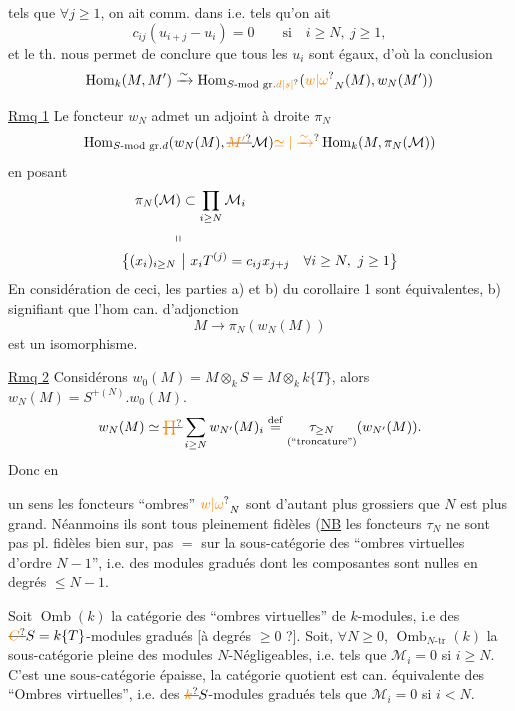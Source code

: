 tels que $\forall j\geq1$, on ait comm. dans
i.e. tels qu'on ait
\[
c_{ij}(u_{i+j}-u_i)=0\qquad\text{si}\quad i\geq N,\ j\geq1,
\]
et le th. nous permet de conclure que tous les $u_i$ sont égaux, d'où la conclusion
\[
\operatorname{Hom}_k(M,M')\xrightarrow{\sim}\operatorname{Hom}_{S\text{-mod gr.}\unsure{d|s|{}}}(\unsure{w|\omega}_N(M),w_N(M'))
\]

\uline{Rmq 1} Le foncteur $w_N$ admet un adjoint à droite $\pi_N$
\[
\operatorname{Hom}_{S\text{-mod gr.}d}(w_N(M),\deleted{\unsure{M'}}\mathcal M)\unsure{\simeq|\xrightarrow{\sim}}\operatorname{Hom}_k(M,\pi_N(\mathcal M))
\]
en posant
\[
\begin{aligned}
\pi_N(\mathcal M)&\subset\prod_{i\geq N}\mathcal M_i\\
\shortparallel&\\
\bigl\{(x_i)_{i\geq N}\ &\big|\ x_iT^{(j)}=c_{ij}x_{j+j}\quad\forall i\geq N,\ j\geq1\bigr\}
\end{aligned}
\]
En considération de ceci,  les parties a) et b) du corollaire 1 sont équivalentes, b) signifiant que l'hom can. d'adjonction
\[
M\longrightarrow\pi_N(w_N(M))
\]
est  un isomorphisme.

\uline{Rmq 2} Considérons $w_0(M)=M\otimes_k S=M\otimes_k k\{T\}$, alors $w_N(M)=S^{+(N)}.w_0(M)$.  
\[
w_N(M)\simeq\deleted{\unsure{\prod}}\sum_{i\geq N}w_{N'}(M)_i\overset{\mathrm{def}}{=}\underset{\text{(``troncature'')}}{\tau_{\geq N}}(w_{N'}(M)).
\]
Donc en

un sens les foncteurs ``ombres'' $\unsure{w|\omega}_N$ sont d'autant plus grossiers que $N$ est plus grand. Néanmoins ils sont tous pleinement fidèles (\uline{NB} les foncteurs $\tau_N$ ne sont pas pl. fidèles bien sur, pas $=$ sur la sous-catégorie des ``ombres virtuelles d'ordre $N-1$'', i.e. des modules gradués dont les composantes sont nulles en degrés $\leq N-1$.

Soit $\operatorname{Omb}(k)$ la catégorie des ``ombres virtuelles'' de $k$-modules, i.e des $\deleted{\unsure{C}}S=k\{T\}$-modules gradués [à degrés $\geq0$ ?]. Soit, $\forall N\geq0$, $\operatorname{Omb}_{N\text{-}\mathrm{tr}}(k)$ la sous-catégorie pleine des modules $N$-Négligeables, i.e. tels que $\mathcal M_i=0$ si $i\geq N$. C'est une sous-catégorie épaisse, la catégorie quotient est can. équivalente   des ``Ombres virtuelles'', i.e. des $\deleted{\unsure{k}}S$-modules gradués tels que $\mathcal M_i=0$ si $i<N$.


